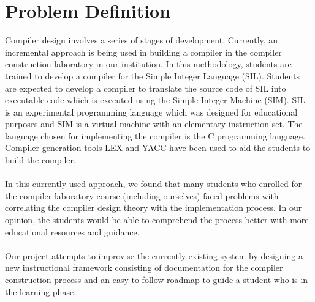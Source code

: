 \chapter{Problem Definition}


Compiler design involves a series of stages of development. Currently, an incremental approach is being used in building a compiler in the compiler construction laboratory in our institution. In this methodology, students are trained to develop a compiler for the Simple Integer Language (SIL). Students are expected to develop a compiler to translate the source code of SIL into executable code which is executed using the Simple Integer Machine (SIM). SIL is an experimental programming language which was designed for educational purposes \cite{citation-3-name-here} and SIM is a virtual machine with an elementary instruction set\cite{citation-4-name-here}. The language chosen for implementing the compiler is the C programming language. Compiler generation tools LEX and YACC have been used to aid the students to build the compiler. 
\\ 
\\
In this currently used approach, we found that many students who enrolled for the compiler laboratory course (including ourselves) faced problems with correlating the compiler design theory with the implementation process. In our opinion, the students would be able to comprehend the process better with more educational resources and guidance. 
\\
\\
Our project attempts to improvise the currently existing system by designing a new instructional framework consisting of documentation for the compiler construction process and an easy to follow roadmap to guide a student who is in the learning phase.   